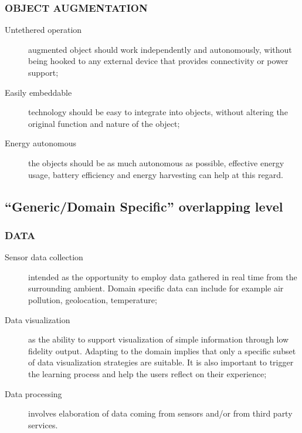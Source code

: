 \subsubsection{OBJECT AUGMENTATION}
\begin{description}
\item [Untethered operation] augmented object should work independently and autonomously, without being hooked to any external device that provides connectivity or power support;
\item [Easily embeddable] technology should be easy to integrate into objects, without altering the original function and nature of the object;
\item [Energy autonomous] the objects should be as much autonomous as possible, effective energy usage, battery efficiency and energy harvesting can help at this regard.
\end{description}


\subsection{``Generic/Domain Specific'' overlapping level}
\medskip

\subsubsection{DATA}
\begin{description}
\item [Sensor data collection] intended as the opportunity to employ data gathered in real time from the surrounding ambient. Domain specific data can include for example air pollution, geolocation, temperature;
\item [Data visualization] as the ability to support visualization of simple information through low fidelity output. Adapting to the domain implies that only a specific subset of data visualization strategies are suitable. It is also important to trigger the learning process and help the users reflect on their experience;
\item [Data processing] involves elaboration of data coming from sensors and/or from third party services.
\end{description}

